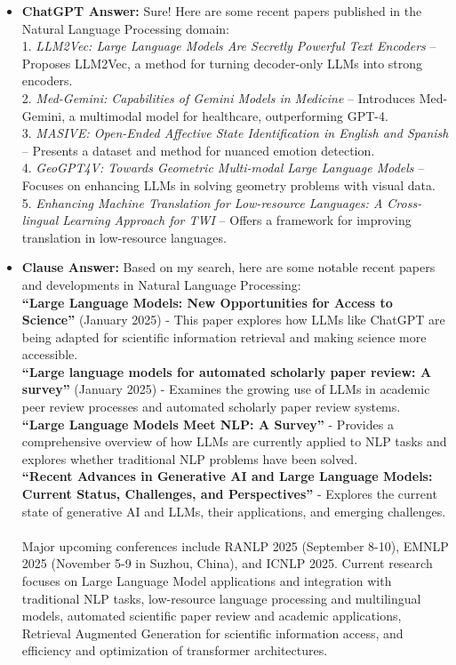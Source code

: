 \documentclass[fleqn,moreauthors,10pt]{ds_report}
\begin{document}
\begin{itemize}
  \item \textbf{ChatGPT Answer:}
  Sure! Here are some recent papers published in the Natural Language Processing domain: \\
  1. \textit{LLM2Vec: Large Language Models Are Secretly Powerful Text Encoders} – Proposes LLM2Vec, a method for turning decoder-only LLMs into strong encoders. \\
  2. \textit{Med-Gemini: Capabilities of Gemini Models in Medicine} – Introduces Med-Gemini, a multimodal model for healthcare, outperforming GPT-4. \\
  3. \textit{MASIVE: Open-Ended Affective State Identification in English and Spanish} – Presents a dataset and method for nuanced emotion detection. \\
  4. \textit{GeoGPT4V: Towards Geometric Multi-modal Large Language Models} – Focuses on enhancing LLMs in solving geometry problems with visual data. \\
  5. \textit{Enhancing Machine Translation for Low-resource Languages: A Cross-lingual Learning Approach for TWI} – Offers a framework for improving translation in low-resource languages.

  \item \textbf{Clause Answer:} Based on my search, here are some notable recent papers and developments in Natural Language Processing: \\
  \textbf{``Large Language Models: New Opportunities for Access to Science''} (January 2025) - This paper explores how LLMs like ChatGPT are being adapted for scientific information retrieval and making science more accessible. 
  \\ \textbf{``Large language models for automated scholarly paper review: A survey''} (January 2025) - Examines the growing use of LLMs in academic peer review processes and automated scholarly paper review systems.\\ \textbf{``Large Language Models Meet NLP: A Survey''} - Provides a comprehensive overview of how LLMs are currently applied to NLP tasks and explores whether traditional NLP problems have been solved. \\ \textbf{``Recent Advances in Generative AI and Large Language Models: Current Status, Challenges, and Perspectives''} - Explores the current state of generative AI and LLMs, their applications, and emerging challenges. \\ \\ Major upcoming conferences include RANLP 2025 (September 8-10), EMNLP 2025 (November 5-9 in Suzhou, China), and ICNLP 2025. Current research focuses on Large Language Model applications and integration with traditional NLP tasks, low-resource language processing and multilingual models, automated scientific paper review and academic applications, Retrieval Augmented Generation for scientific information access, and efficiency and optimization of transformer architectures.
\end{itemize}
\end{document}
